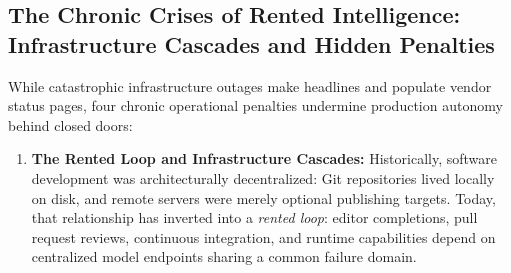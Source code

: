 \subsection{The Chronic Crises of Rented Intelligence: Infrastructure Cascades and Hidden Penalties}
\label{subsec:quieter_crises}

While catastrophic infrastructure outages make headlines and populate vendor status pages, four chronic operational penalties undermine production autonomy behind closed doors:

\begin{enumerate}[leftmargin=*]
  \item \textbf{The Rented Loop and Infrastructure Cascades:} Historically, software development was architecturally decentralized: Git repositories lived locally on disk, and remote servers were merely optional publishing targets. Today, that relationship has inverted into a \emph{rented loop}: editor completions, pull request reviews, continuous integration, and runtime capabilities depend on centralized model endpoints sharing a common failure domain. 
  

\end{enumerate}

